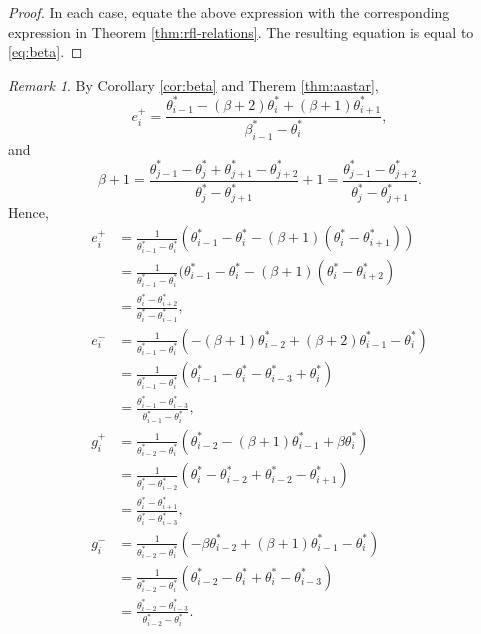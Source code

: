 \documentclass[
]{book}
\theoremstyle{definition}
\theoremstyle{definition}
\theoremstyle{definition}
\theoremstyle{definition}
\theoremstyle{remark}
\newtheorem*{remark}{Remark}
\begin{document}
\begin{proof}
In each case, equate the above expression with the corresponding expression in Theorem \ref{thm:rfl-relations}.
The resulting equation is equal to \eqref{eq:beta}.
\end{proof}

\begin{remark}
By Corollary \ref{cor:beta} and Therem \ref{thm:aastar},
\[e^+_i = \frac{\theta^*_{i-1}-(\beta+2)\theta^*_i + (\beta+1)\theta^*_{i+1}}{\beta^*_{i-1}-\theta^*_i},\]
and
\[\beta + 1 = \frac{\theta^*_{j-1}-\theta^*_j+\theta^*_{j+1}-\theta^*_{j+2}}{\theta^*_j-\theta^*_{j+1}}+1 = \frac{\theta^*_{j-1}-\theta^*_{j+2}}{\theta^*_j-\theta^*_{j+1}}.\]
Hence,
\begin{align}
e^+_i & = \frac{1}{\theta^*_{i-1}-\theta^*_i}(\theta^*_{i-1}-\theta^*_i-(\beta+1)(\theta^*_i-\theta^*_{i+1}))\\
& = \frac{1}{\theta^*_{i-1}-\theta^*_i}(\theta^*_{i-1}-\theta^*_i - (\beta+1)(\theta^*_i-\theta^*_{i+2})\\
& = \frac{\theta^*_i-\theta^*_{i+2}}{\theta^*_{i}-\theta^*_{i-1}},\\
e^-_i & = \frac{1}{\theta^*_{i-1}-\theta^*_i}(-(\beta+1)\theta^*_{i-2}+(\beta+2)\theta^*_{i-1}-\theta^*_i)\\
& = \frac{1}{\theta^*_{i-1}-\theta^*_i}(\theta^*_{i-1}-\theta^*_i - \theta^*_{i-3}+\theta^*_{i})\\
& = \frac{\theta^*_{i-1}-\theta^*_{i-3}}{\theta^*_{i-1}-\theta^*_{i}},\\
g^+_i & = \frac{1}{\theta^*_{i-2}-\theta^*_i}(\theta^*_{i-2}-(\beta+1)\theta^*_{i-1}+\beta\theta^*_{i})\\
& = \frac{1}{\theta^*_{i}-\theta^*_{i-2}}(\theta^*_{i}-\theta^*_{i-2} + \theta^*_{i-2}-\theta^*_{i+1})\\
& = \frac{\theta^*_i-\theta^*_{i+1}}{\theta^*_{i}-\theta^*_{i-3}},\\
g^-_i & = \frac{1}{\theta^*_{i-2}-\theta^*_i}(-\beta\theta^*_{i-2}+(\beta+1)\theta^*_{i-1}-\theta^*_i)\\
& = \frac{1}{\theta^*_{i-2}-\theta^*_i}(\theta^*_{i-2}-\theta^*_i + \theta^*_{i}-\theta^*_{i-3})\\
& = \frac{\theta^*_{i-2}-\theta^*_{i-3}}{\theta^*_{i-2}-\theta^*_{i}}.
\end{align}
\end{remark}
\end{document}
